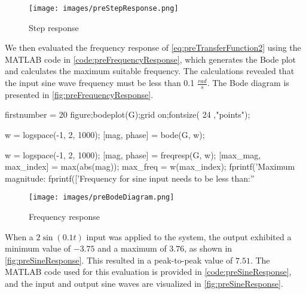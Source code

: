 \begin{figure}
	\centering
	\texttt{[image: images/preStepResponse.png]}
	\caption{Step response}
	\label{fig:preStepResponse}
\end{figure}


We then evaluated the frequency response of \autoref{eq:preTransferFunction2} using the MATLAB code in \autoref{code:preFrequencyResponse}, which generates the Bode plot and calculates the maximum suitable frequency. The calculations revealed that the input sine wave frequency must be less than 0.1 $\frac{rad}{s}$. The Bode diagram is presented in \autoref{fig:preFrequencyResponse}.

\begin{code}
	\begin{matlabcode}{firstnumber = 20}
		figure;bodeplot(G);grid on;fontsize( 24 ,"points");
		
		w = logspace(-1, 2, 1000); %
		[mag, phase] = bode(G, w); %
		
		w = logspace(-1, 2, 1000);
		[mag, phase] = freqresp(G, w);
		[max_mag, max_index] = max(abs(mag));
		max_freq = w(max_index);
		fprintf('Maximum magnitude: %
		fprintf(['Frequency for sine input needs to be less than:''%
	\end{matlabcode}
	\label{code:preFrequencyResponse}
\end{code}

\begin{figure}
	\centering
	\texttt{[image: images/preBodeDiagram.png]}
	\caption{Frequency response}
	\label{fig:preFrequencyResponse}
\end{figure}


When a $2\sin(0.1t)$ input was applied to the system, the output exhibited a minimum value of $-3.75$ and a maximum of $3.76$, as shown in \autoref{fig:preSineResponse}. This resulted in a peak-to-peak value of $7.51$. The MATLAB code used for this evaluation is provided in \autoref{code:preSineResponse}, and the input and output sine waves are visualized in \autoref{fig:preSineResponse}.

